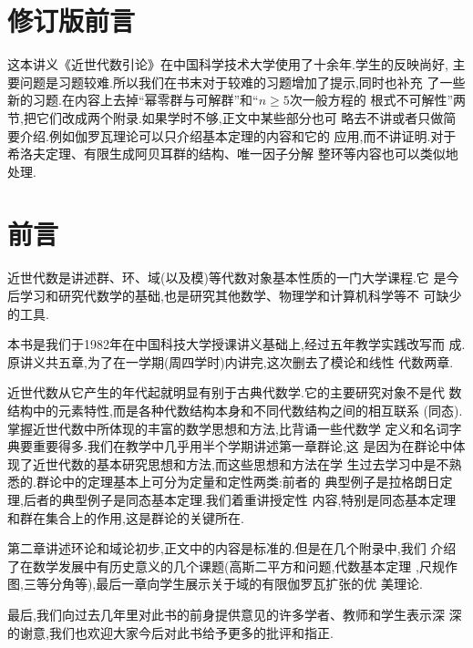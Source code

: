 \chapter{修订版前言}\label{prf:1}
这本讲义《近世代数引论》在中国科学技术大学使用了十余年.学生的反映尚好,
主要问题是习题较难.所以我们在书末对于较难的习题增加了提示,同时也补充
了一些新的习题.在内容上去掉“幂零群与可解群”和“$n \geq 5$次一般方程的
根式不可解性”两节,把它们改成两个附录.如果学时不够,正文中某些部分也可
略去不讲或者只做简要介绍.例如伽罗瓦理论可以只介绍基本定理的内容和它的
应用,而不讲证明.对于希洛夫定理、有限生成阿贝耳群的结构、唯一因子分解
整环等内容也可以类似地处理.\par

\chapter{前言}\label{prf:2}
近世代数是讲述群、环、域(以及模)等代数对象基本性质的一门大学课程.它
是今后学习和研究代数学的基础,也是研究其他数学、物理学和计算机科学等不
可缺少的工具.\par
本书是我们于1982年在中国科技大学授课讲义基础上,经过五年教学实践改写而
成.原讲义共五章,为了在一学期(周四学时)内讲完,这次删去了模论和线性
代数两章.\par
近世代数从它产生的年代起就明显有别于古典代数学.它的主要研究对象不是代
数结构中的元素特性,而是各种代数结构本身和不同代数结构之间的相互联系
(同态).掌握近世代数中所体现的丰富的数学思想和方法,比背诵一些代数学
定义和名词字典要重要得多.我们在教学中几乎用半个学期讲述第一章群论,这
是因为在群论中体现了近世代数的基本研究思想和方法,而这些思想和方法在学
生过去学习中是不熟悉的.群论中的定理基本上可分为定量和定性两类:前者的
典型例子是拉格朗日定理,后者的典型例子是同态基本定理.我们着重讲授定性
内容,特别是同态基本定理和群在集合上的作用,这是群论的关键所在.\par
第二章讲述环论和域论初步,正文中的内容是标准的.但是在几个附录中,我们
介绍了在数学发展中有历史意义的几个课题(高斯二平方和问题,代数基本定理
,尺规作图,三等分角等),最后一章向学生展示关于域的有限伽罗瓦扩张的优
美理论.\par
最后,我们向过去几年里对此书的前身提供意见的许多学者、教师和学生表示深
深的谢意,我们也欢迎大家今后对此书给予更多的批评和指正.\par
